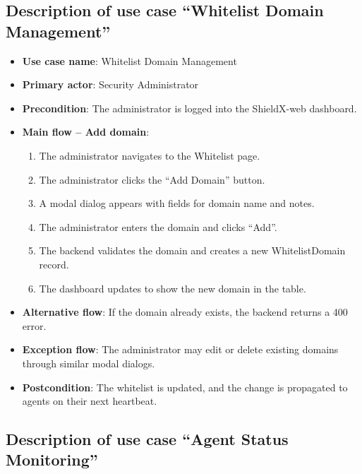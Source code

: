 \documentclass[../Main.tex]{subfiles}
\begin{document}
\subsection{Description of use case ``Whitelist Domain Management''}

\begin{itemize}
    \item \textbf{Use case name}: Whitelist Domain Management
    \item \textbf{Primary actor}: Security Administrator
    \item \textbf{Precondition}: The administrator is logged into the ShieldX-web dashboard.
    \item \textbf{Main flow -- Add domain}:
        \begin{enumerate}
            \item The administrator navigates to the Whitelist page.
            \item The administrator clicks the ``Add Domain'' button.
            \item A modal dialog appears with fields for domain name and notes.
            \item The administrator enters the domain and clicks ``Add''.
            \item The backend validates the domain and creates a new WhitelistDomain record.
            \item The dashboard updates to show the new domain in the table.
        \end{enumerate}
    \item \textbf{Alternative flow}: If the domain already exists, the backend returns a 400 error.
    \item \textbf{Exception flow}: The administrator may edit or delete existing domains through similar modal dialogs.
    \item \textbf{Postcondition}: The whitelist is updated, and the change is propagated to agents on their next heartbeat.
\end{itemize}

\subsection{Description of use case ``Agent Status Monitoring''}
\end{document}
